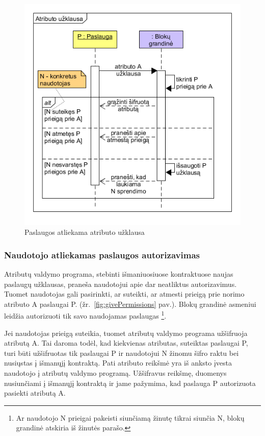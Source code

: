 \begin{figure}[h]
    \centering
    \includegraphics[scale=0.7]{img/askForAttributeSequence}
    \caption{Paslaugos atliekama atributo užklausa}
    \label{fig:askForAttributeSequence}
\end{figure}

\subsubsection{Naudotojo atliekamas paslaugos autorizavimas}

Atributų valdymo programa, stebinti išmaniuosiuose kontraktuose naujas paslaugų užklausas, praneša naudotojui apie dar
neatliktus autorizavimus. Tuomet naudotojas gali pasirinkti, ar suteikti, ar atmesti prieigą prie norimo atributo
A paslaugai P. (žr.\hypertarget{fig:givePermissions}{~\ref{fig:givePermissions} pav.}). Blokų grandinė asmeniui leidžia autorizuoti tik savo naudojamas paslaugas
\footnote{ Ar naudotojo N prieigai pakeisti siunčiamą žinutę tikrai siunčia N, blokų grandinė atskiria iš žinutės parašo.}.

Jei naudotojas prieigą suteikia, tuomet atributų valdymo programa užšifruoja atributą A. Tai
daroma todėl, kad kiekvienas atributas, suteiktas paslaugai P, turi būti užšifruotas tik paslaugai P ir naudotojui N
žinomu šifro raktu bei nusiųstas
į išmanųjį kontraktą. Pati atributo reikšmė yra iš anksto įvesta naudotojo į atributų valdymo programą.
Užšifravus reikšmę, duomenys nusiunčiami į išmanųjį kontraktą ir jame pažymima, kad paslauga P autorizuota
pasiekti atributą A.

